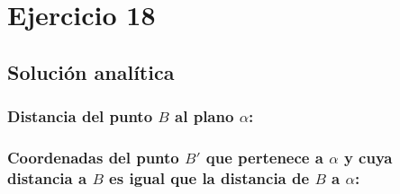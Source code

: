 \newpage
\clearpage

\section{Ejercicio 18}



\newpage
\subsection{Solución analítica}



\newpage
\subsubsection{\texorpdfstring{Distancia del punto $B$ al plano $\alpha$:}{}}


\newpage
\subsubsection{\texorpdfstring{Coordenadas del punto $B'$ que pertenece a $\alpha$ y cuya distancia a $B$ es igual que la distancia de $B$ a $\alpha$:}{}}


